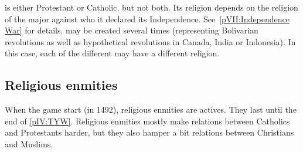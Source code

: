 \aparag \paysUSA is either Protestant or Catholic, but not both.
\bparag Its religion depends on the religion of the major against who it
declared its Independence. See~\ref{pVII:Independence War} for details.
\bparag \paysUSA may be created several times (representing Bolivarian
revolutions as well as hypothetical revolutions in Canada, India or
Indonesia). In this case, each of the different \paysUSA may have a different
religion.



\subsection{Religious enmities}

\aparag When the game start (in 1492), religious enmities are actives. They
last until the end of \ref{pIV:TYW}.
\bparag Religious enmities mostly make relations between Catholics and
Protestants harder, but they also hamper a bit relations between Christians
and Muslims.






